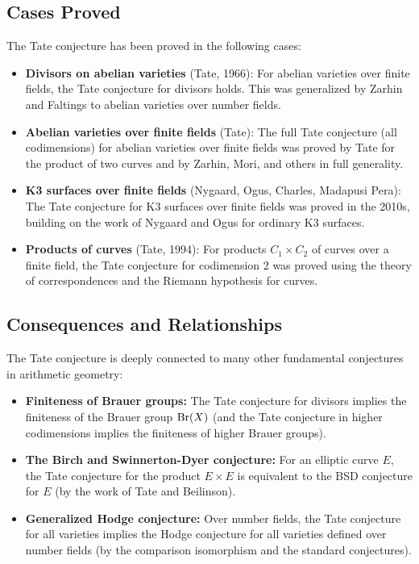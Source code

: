 \subsection{Cases Proved}

The Tate conjecture has been proved in the following cases:
\begin{itemize}
    \item \textbf{Divisors on abelian varieties} (Tate, 1966): For abelian varieties over finite fields, the Tate conjecture for divisors holds. This was generalized by Zarhin and Faltings to abelian varieties over number fields.
    \item \textbf{Abelian varieties over finite fields} (Tate): The full Tate conjecture (all codimensions) for abelian varieties over finite fields was proved by Tate for the product of two curves and by Zarhin, Mori, and others in full generality.
    \item \textbf{K3 surfaces over finite fields} (Nygaard, Ogus, Charles, Madapusi Pera): The Tate conjecture for K3 surfaces over finite fields was proved in the 2010s, building on the work of Nygaard and Ogus for ordinary K3 surfaces.
    \item \textbf{Products of curves} (Tate, 1994): For products \(C_1 \times C_2\) of curves over a finite field, the Tate conjecture for codimension 2 was proved using the theory of correspondences and the Riemann hypothesis for curves.
\end{itemize}

\subsection{Consequences and Relationships}

The Tate conjecture is deeply connected to many other fundamental conjectures in arithmetic geometry:
\begin{itemize}
    \item \textbf{Finiteness of Brauer groups:} The Tate conjecture for divisors implies the finiteness of the Brauer group \(\operatorname{Br}(X)\) (and the Tate conjecture in higher codimensions implies the finiteness of higher Brauer groups).
    \item \textbf{The Birch and Swinnerton-Dyer conjecture:} For an elliptic curve \(E\), the Tate conjecture for the product \(E \times E\) is equivalent to the BSD conjecture for \(E\) (by the work of Tate and Beilinson).
    \item \textbf{Generalized Hodge conjecture:} Over number fields, the Tate conjecture for all varieties implies the Hodge conjecture for all varieties defined over number fields (by the comparison isomorphism and the standard conjectures).
\end{itemize}

